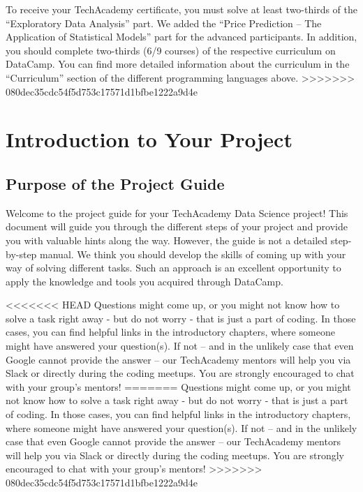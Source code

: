 \documentclass[
  11pt,
]{article}
\begin{document}
To receive your TechAcademy certificate, you must solve at least two-thirds of the ``Exploratory Data Analysis'' part. We added the ``Price Prediction -- The Application of Statistical Models'' part for the advanced participants. In addition, you should complete two-thirds (6/9 courses) of the respective curriculum on DataCamp. You can find more detailed information about the curriculum in the ``Curriculum'' section of the different programming languages above.
>>>>>>> 080dec35cdc54f5d753c17571d1bfbe1222a9d4e

\newpage

\hypertarget{introduction-to-your-project}{%
\section{Introduction to Your Project}\label{introduction-to-your-project}}

\hypertarget{purpose-of-the-project-guide}{%
\subsection{Purpose of the Project Guide}\label{purpose-of-the-project-guide}}

Welcome to the project guide for your TechAcademy Data Science project!
This document will guide you through the different steps of your project and provide you with valuable hints along the way.
However, the guide is not a detailed step-by-step manual.
We think you should develop the skills of coming up with your way of solving different tasks.
Such an approach is an excellent opportunity to apply the knowledge and tools you acquired through DataCamp.

<<<<<<< HEAD
Questions might come up, or you might not know how to solve a task right away - but do not worry - that is just a part of coding.
In those cases, you can find helpful links in the introductory chapters, where someone might have answered your question(s).
If not -- and in the unlikely case that even Google cannot provide the answer -- our TechAcademy mentors will help you via Slack or directly during the coding meetups.
You are strongly encouraged to chat with your group's mentors!
=======
Questions might come up, or you might not know how to solve a task right away - but do not worry - that is just a part of coding. In those cases, you can find helpful links in the introductory chapters, where someone might have answered your question(s). If not -- and in the unlikely case that even Google cannot provide the answer -- our TechAcademy mentors will help you via Slack or directly during the coding meetups. You are strongly encouraged to chat with your group's mentors!
>>>>>>> 080dec35cdc54f5d753c17571d1bfbe1222a9d4e
\end{document}
